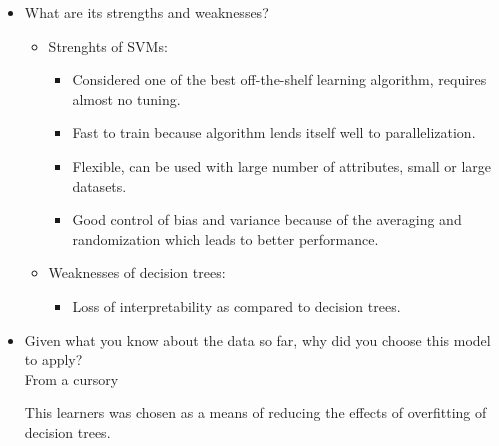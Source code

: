 \documentclass[12pt]{article}
\begin{document}
\begin{itemize}
\item What are its strengths and weaknesses?\\
\begin{itemize}[noitemsep,nolistsep]
       \item Strenghts of SVMs:
              \begin{itemize}[noitemsep,nolistsep]
                     \item Considered one of the best off-the-shelf learning algorithm, requires almost no tuning. 
                     \item Fast to train because algorithm lends itself well to parallelization.
                     \item Flexible, can be used with large number of attributes, small or large datasets.
                     \item Good control of bias and variance because of the averaging and randomization which leads to better performance.
              \end{itemize}
       \item Weaknesses of decision trees:
              \begin{itemize}[noitemsep,nolistsep]
                     \item Loss of interpretability as compared to decision trees.
              \end{itemize}
       \end{itemize}


\item Given what you know about the data so far, why did you choose this model to apply?\\
From a cursory

This learners was chosen as a means of reducing the effects of overfitting of decision trees.
\end{itemize} 



\end{document}

